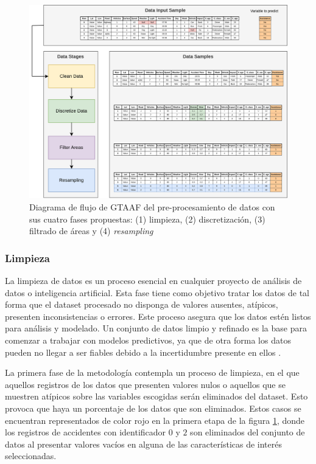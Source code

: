 \begin{figure}[H]
	\centering
	\includegraphics[width=14cm]{Figures/Preprocessing.png}
	\caption{Diagrama de flujo de GTAAF del pre-procesamiento de datos con sus cuatro fases propuestas: (1) limpieza, (2) discretización, (3) filtrado de áreas y (4) \textit{resampling}}
	\label{PreprocessingStage}
\end{figure}

\subsubsection{Limpieza}

La limpieza de datos es un proceso esencial en cualquier proyecto de análisis de datos o inteligencia artificial. Esta fase tiene como objetivo tratar los datos de tal forma que el dataset procesado no disponga de valores ausentes, atípicos, presenten inconsistencias o errores. Este proceso asegura que los datos estén listos para análisis y modelado. Un conjunto de datos limpio y refinado es la base para comenzar a trabajar con modelos predictivos, ya que de otra forma los datos pueden no llegar a ser fiables debido a la incertidumbre presente en ellos \cite{ilyas2019data}.

La primera fase de la metodología contempla un proceso de limpieza, en el que aquellos registros de los datos que presenten valores nulos o aquellos que se muestren atípicos sobre las variables escogidas serán eliminados del dataset. Esto provoca que haya un porcentaje de los datos que son eliminados. Estos casos se encuentran representados de color rojo en la primera etapa de la figura \ref{PreprocessingStage}, donde los registros de accidentes con identificador $0$ y $2$ son eliminados del conjunto de datos al presentar valores vacíos en alguna de las características de interés seleccionadas.



